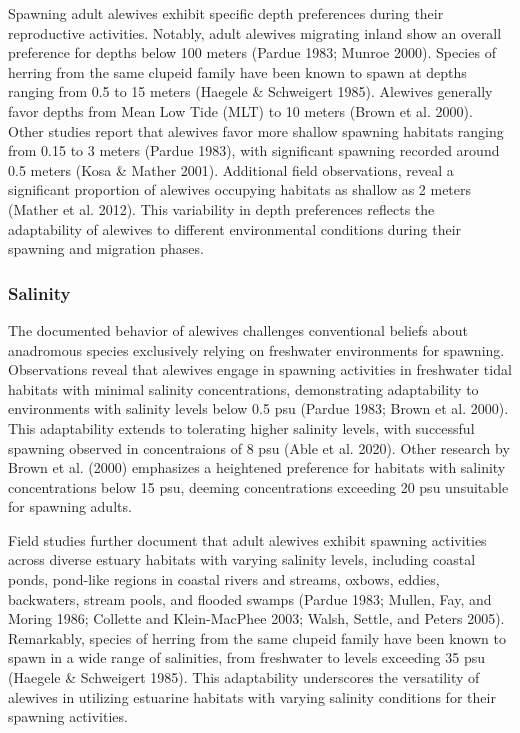 \documentclass[
]{book}
\begin{document}
Spawning adult alewives exhibit specific depth preferences during their reproductive activities. Notably, adult alewives migrating inland show an overall preference for depths below 100 meters (Pardue 1983; Munroe 2000). Species of herring from the same clupeid family have been known to spawn at depths ranging from 0.5 to 15 meters (Haegele \& Schweigert 1985). Alewives generally favor depths from Mean Low Tide (MLT) to 10 meters (Brown et al. 2000). Other studies report that alewives favor more shallow spawning habitats ranging from 0.15 to 3 meters (Pardue 1983), with significant spawning recorded around 0.5 meters (Kosa \& Mather 2001). Additional field observations, reveal a significant proportion of alewives occupying habitats as shallow as 2 meters (Mather et al. 2012). This variability in depth preferences reflects the adaptability of alewives to different environmental conditions during their spawning and migration phases.

\hypertarget{salinity}{%
\subsubsection{Salinity}\label{salinity}}

The documented behavior of alewives challenges conventional beliefs about anadromous species exclusively relying on freshwater environments for spawning. Observations reveal that alewives engage in spawning activities in freshwater tidal habitats with minimal salinity concentrations, demonstrating adaptability to environments with salinity levels below 0.5 psu (Pardue 1983; Brown et al. 2000). This adaptability extends to tolerating higher salinity levels, with successful spawning observed in concentraions of 8 psu (Able et al. 2020). Other research by Brown et al. (2000) emphasizes a heightened preference for habitats with salinity concentrations below 15 psu, deeming concentrations exceeding 20 psu unsuitable for spawning adults.

Field studies further document that adult alewives exhibit spawning activities across diverse estuary habitats with varying salinity levels, including coastal ponds, pond-like regions in coastal rivers and streams, oxbows, eddies, backwaters, stream pools, and flooded swamps (Pardue 1983; Mullen, Fay, and Moring 1986; Collette and Klein-MacPhee 2003; Walsh, Settle, and Peters 2005). Remarkably, species of herring from the same clupeid family have been known to spawn in a wide range of salinities, from freshwater to levels exceeding 35 psu (Haegele \& Schweigert 1985). This adaptability underscores the versatility of alewives in utilizing estuarine habitats with varying salinity conditions for their spawning activities.
\end{document}
